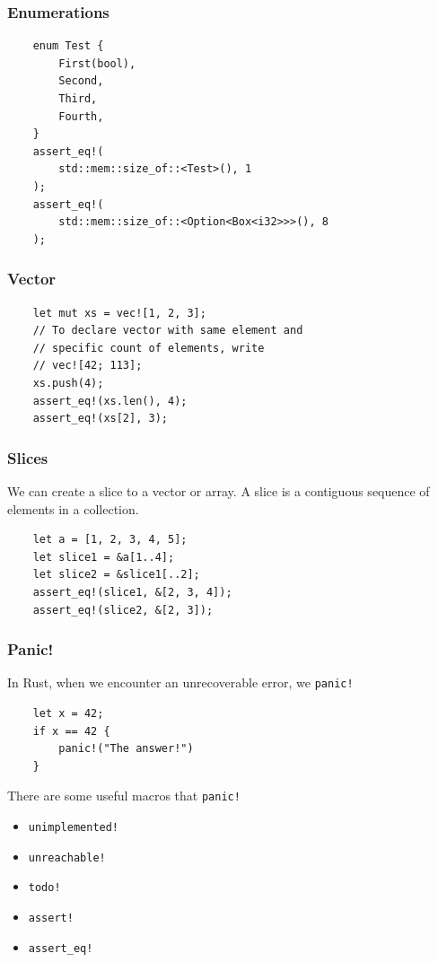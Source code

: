 \documentclass[aspectratio=1610,t]{beamer}
\begin{document}

\begin{frame}[fragile]
\frametitle{Enumerations}

\begin{verbatim}
    enum Test {
        First(bool),
        Second,
        Third,
        Fourth,
    }
    assert_eq!(
        std::mem::size_of::<Test>(), 1
    );
    assert_eq!(
        std::mem::size_of::<Option<Box<i32>>>(), 8
    );
\end{verbatim}
\end{frame}


\begin{frame}[fragile]
\frametitle{Vector}
\begin{verbatim}
    let mut xs = vec![1, 2, 3];
    // To declare vector with same element and
    // specific count of elements, write
    // vec![42; 113];
    xs.push(4);
    assert_eq!(xs.len(), 4);
    assert_eq!(xs[2], 3);
\end{verbatim}
\end{frame}


\begin{frame}[fragile]
\frametitle{Slices}
We can create a slice to a vector or array. A slice is a contiguous sequence of elements in a collection.

\begin{verbatim}
    let a = [1, 2, 3, 4, 5];
    let slice1 = &a[1..4];
    let slice2 = &slice1[..2];
    assert_eq!(slice1, &[2, 3, 4]);
    assert_eq!(slice2, &[2, 3]);
\end{verbatim}
\end{frame}


\begin{frame}[fragile]
\frametitle{Panic!}
In Rust, when we encounter an unrecoverable error, we \texttt{panic!}

\begin{verbatim}
    let x = 42;
    if x == 42 {
        panic!("The answer!")
    }
\end{verbatim}

There are some useful macros that \texttt{panic!}

\begin{itemize}
    \item \texttt{unimplemented!}
    \item \texttt{unreachable!}
    \item \texttt{todo!}
    \item \texttt{assert!}
    \item \texttt{assert\_eq!}
\end{itemize}
\end{frame}
\end{document}
